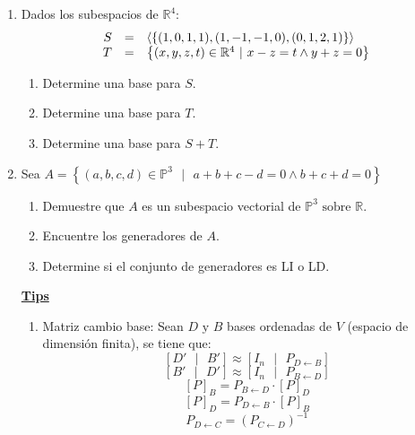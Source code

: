 \documentclass[12pt]{article}
\begin{document}
\begin{enumerate}
    \item Dados los subespacios de $\mathbb{R}^4$:
          $$\begin{array}[]{rcl}
                  S & = & \langle\left\{(1,0,1,1),(1,-1,-1,0),(0,1,2,1)\right\}\rangle                \\
                  T & = & \left\{(x,y,z,t) \in \mathbb{R}^4\mbox{ }|\mbox{ }x-z=t\wedge y+z=0\right\}
              \end{array}$$
          \begin{enumerate}
              \item Determine una base para $S$.
              \item Determine una base para $T$.
              \item Determine una base para $S+T$.
          \end{enumerate}

    \item Sea $A=\left\{(a,b,c,d) \in \mathbb{P}^3\mbox{ }|\mbox{ }a+b+c-d=0 \wedge b+c+d=0 \right\}$
          \begin{enumerate}
              \item Demuestre que $A$ es un subespacio vectorial de $\mathbb{P}^3 \mbox{ sobre }\mathbb{R}$.
              \item Encuentre los generadores de $A$.
              \item Determine si el conjunto de generadores es LI o LD.
          \end{enumerate}

          \pagebreak
          \begin{center}
              \textbf{\underline{Tips}}
          \end{center}
          \begin{enumerate}
              \item Matriz cambio base:
                    \subitem Sean $D \mbox{ y } B$ bases ordenadas de $V$ (espacio de
                    dimensi\'on finita), se tiene que:
                    \subitem $$[D'\mbox{ }|\mbox{ }B']\approx [I_n\mbox{ }|\mbox{ }P_{D\leftarrow B}]$$
                    $$[B'\mbox{ }|\mbox{ }D']\approx [I_n\mbox{ }|\mbox{ }P_{B\leftarrow D}]$$
                    $$[P]_B=P_{B\leftarrow D}\cdot [P]_D$$
                    $$[P]_D=P_{D\leftarrow B}\cdot [P]_B$$
                    $$P_{D\leftarrow C}=(P_{C\leftarrow D})^{-1}$$
          \end{enumerate}
\end{enumerate}
\end{document}
